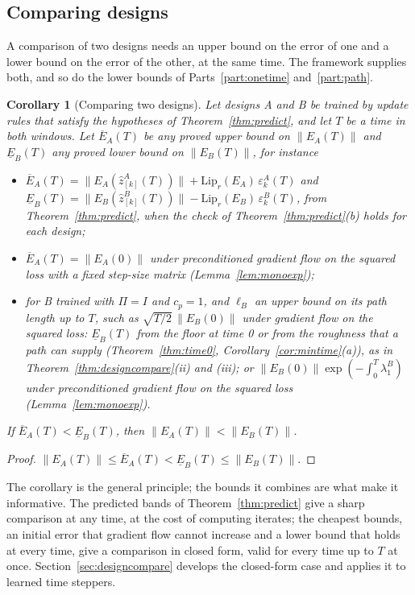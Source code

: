 \documentclass[11pt]{article}
\newtheorem{corollary}{Corollary}
\theoremstyle{definition}
\theoremstyle{remark}
\begin{document}
\subsection{Comparing designs}

A comparison of two designs needs an upper bound on the error of one and a lower bound on the error of the other, at the same time.
The framework supplies both, and so do the lower bounds of Parts~\ref{part:onetime} and~\ref{part:path}.

\begin{corollary}[Comparing two designs]\label{cor:compare}
Let designs A and B be trained by update rules that satisfy the hypotheses of Theorem~\ref{thm:predict}, and let $T$ be a time in both windows.
Let $\overline{E}_A(T)$ be any proved upper bound on $\|E_A(T)\|$ and $\underline{E}_B(T)$ any proved lower bound on $\|E_B(T)\|$, for instance
\begin{itemize}
\item $\overline{E}_A(T) = \|E_A(\hat z^A_{[k]}(T))\| + \mathrm{Lip}_r(E_A)\,\varepsilon^A_k(T)$ and $\underline{E}_B(T) = \|E_B(\hat z^B_{[k]}(T))\| - \mathrm{Lip}_r(E_B)\,\varepsilon^B_k(T)$, from Theorem~\ref{thm:predict}, when the check of Theorem~\ref{thm:predict}(b) holds for each design;
\item $\overline{E}_A(T) = \|E_A(0)\|$ under preconditioned gradient flow on the squared loss with a fixed step-size matrix (Lemma~\ref{lem:monoexp});
\item for B trained with $\Pi = I$ and $c_p = 1$, and $\ell_B$ an upper bound on its path length up to $T$, such as $\sqrt{T/2}\,\|E_B(0)\|$ under gradient flow on the squared loss: $\underline{E}_B(T)$ from the floor at time 0 or from the roughness that a path can supply (Theorem~\ref{thm:time0}, Corollary~\ref{cor:mintime}(a)), as in Theorem~\ref{thm:designcompare}(ii) and (iii); or $\|E_B(0)\|\exp(-\int_0^T\lambda_1^B)$ under preconditioned gradient flow on the squared loss (Lemma~\ref{lem:monoexp}).
\end{itemize}
If $\overline{E}_A(T) < \underline{E}_B(T)$, then $\|E_A(T)\| < \|E_B(T)\|$.
\end{corollary}

\begin{proof}
$\|E_A(T)\|\le\overline{E}_A(T) < \underline{E}_B(T)\le\|E_B(T)\|$.
\end{proof}

The corollary is the general principle; the bounds it combines are what make it informative.
The predicted bands of Theorem~\ref{thm:predict} give a sharp comparison at any time, at the cost of computing iterates; the cheapest bounds, an initial error that gradient flow cannot increase and a lower bound that holds at every time, give a comparison in closed form, valid for every time up to $T$ at once.
Section~\ref{sec:designcompare} develops the closed-form case and applies it to learned time steppers.
\end{document}
